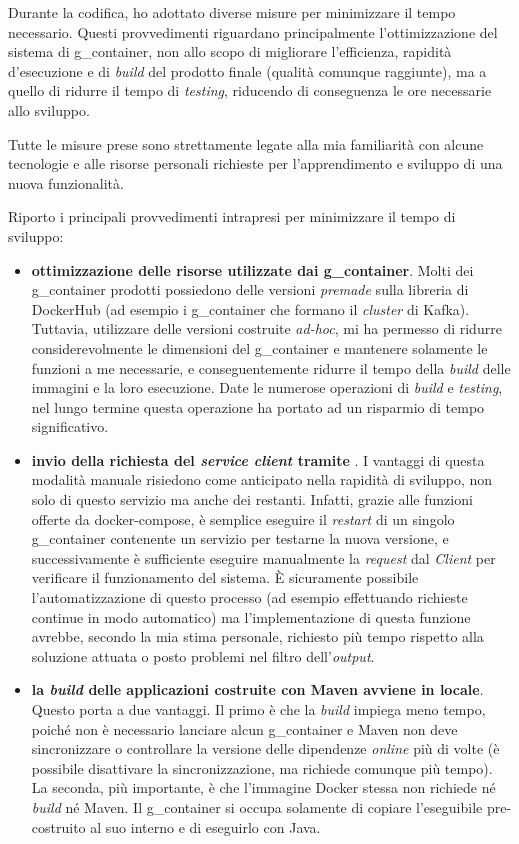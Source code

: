 Durante la codifica, ho adottato diverse misure per minimizzare il tempo necessario.
Questi provvedimenti riguardano principalmente l'ottimizzazione del sistema di \gls{g_container}, non allo scopo di migliorare l'efficienza, rapidità d'esecuzione e di \textit{build} del prodotto finale (qualità comunque raggiunte), ma a quello di ridurre il tempo di \textit{testing}, riducendo di conseguenza le ore necessarie allo sviluppo.

Tutte le misure prese sono strettamente legate alla mia familiarità con alcune tecnologie e alle risorse personali richieste per l'apprendimento e sviluppo di una nuova funzionalità.

\noindent
Riporto i principali provvedimenti intrapresi per minimizzare il tempo di sviluppo:
\begin{itemize}
  \item \textbf{ottimizzazione delle risorse utilizzate dai \gls{g_container}}.
  Molti dei \gls{g_container} prodotti possiedono delle versioni \textit{premade} sulla libreria di DockerHub (ad esempio i \gls{g_container} che formano il \textit{cluster} di Kafka).
  Tuttavia, utilizzare delle versioni costruite \textit{ad-hoc}, mi ha permesso di ridurre considerevolmente le dimensioni del \gls{g_container} e mantenere solamente le funzioni a me necessarie, e conseguentemente ridurre il tempo della \textit{build} delle immagini e la loro esecuzione.
  Date le numerose operazioni di \textit{build} e \textit{testing}, nel lungo termine questa operazione ha portato ad un risparmio di tempo significativo.
  \item \textbf{invio della richiesta  del \textit{service client} tramite }.
  I vantaggi di questa modalità manuale risiedono come anticipato nella rapidità di sviluppo, non solo di questo servizio ma anche dei restanti.
  Infatti, grazie alle funzioni offerte da docker-compose, è semplice eseguire il \textit{restart} di un singolo \gls{g_container} contenente un servizio per testarne la nuova versione, e successivamente è sufficiente eseguire manualmente la \textit{request} dal  \textit{Client} per verificare il funzionamento del sistema.
  È sicuramente possibile l'automatizzazione di questo processo (ad esempio effettuando richieste continue in modo automatico) ma l'implementazione di questa funzione avrebbe, secondo la mia stima personale, richiesto più tempo rispetto alla soluzione attuata o posto problemi nel filtro dell'\textit{output}.
  \item \textbf{la \textit{build} delle applicazioni costruite con Maven avviene in locale}.
  Questo porta a due vantaggi.
  Il primo è che la \textit{build} impiega meno tempo, poiché non è necessario lanciare alcun \gls{g_container} e Maven non deve sincronizzare o controllare la versione delle dipendenze \textit{online} più di volte (è possibile  disattivare la sincronizzazione, ma richiede comunque più tempo).
  La seconda, più importante, è che l'immagine Docker stessa non richiede né \textit{build} né Maven.
  Il \gls{g_container} si occupa solamente di copiare l'eseguibile pre-costruito al suo interno e di eseguirlo con Java.
\end{itemize}

